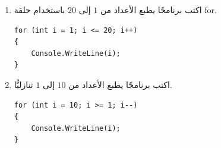 \documentclass[14pt]{extarticle}
\begin{document}
\begin{enumerate}[resume, itemsep=1em]
{\begin{tabular}{|C{1cm}|p{6.2cm}|C{1cm}|p{6.2cm}|}
& $\mathbf{F}$ &
\begin{pycell}
\begin{english}
\begin{verbatim}
for (int i = 6; i <= 30; i += 6)
{
    Console.WriteLine(i);
}
\end{verbatim}
\end{english}
\end{pycell}
\\ \hline
\end{tabular}
\par}
\ifwithsols
\begin{boxSolution}
\begin{itemize}[nosep]
    \item $\mathbf{A}$: يطبع الرمز \textenglish{"!"} خمس مرّات (كل مرّة في سطر).
    \item $\mathbf{B}$: يطبع الرمز \textenglish{"*"} ستّ مرّات (من $10$ إلى $5$).
    \item $\mathbf{C}$: يطبع الأعداد: $1, 2, 3, 4$.
    \item $\mathbf{D}$: يطبع الأعداد: $3, 9, 15, 21, 27$ (لأنّ $i$ يأخذ القيم $1, 3, 5, 7, 9$).
    \item $\mathbf{E}$: يطبع الأعداد: $14, 12, 10, 8, 6, 4, 2, 0$.
    \item $\mathbf{F}$: يطبع الأعداد: $6, 12, 18, 24, 30$.
\end{itemize}
\end{boxSolution}
\fi
\filbreak

\item اكتب برنامجًا يطبع الأعداد من $1$ إلى $20$ باستخدام حلقة \textenglish{for}.
\ifwithsols
\begin{boxSolution}
\begin{english}
\begin{verbatim}
for (int i = 1; i <= 20; i++)
{
    Console.WriteLine(i);
}
\end{verbatim}
\end{english}
\end{boxSolution}
\fi
\filbreak

\item اكتب برنامجًا يطبع الأعداد من $10$ إلى $1$ تنازليًّا.
\ifwithsols
\begin{boxSolution}
\begin{english}
\begin{verbatim}
for (int i = 10; i >= 1; i--)
{
    Console.WriteLine(i);
}
\end{verbatim}
\end{english}
\end{boxSolution}
\fi
\filbreak


\end{enumerate}
\end{document}
